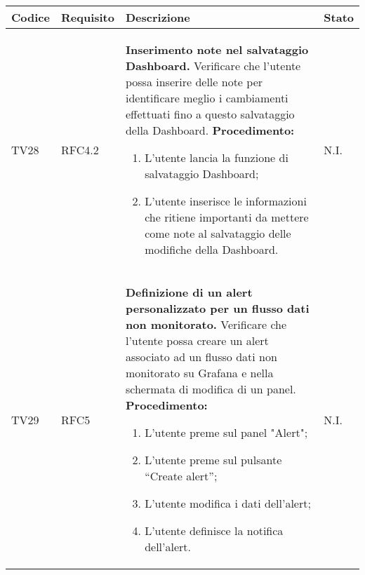 \begin{table}[!htpb]
	\centering
	\renewcommand{\arraystretch}{2} 
	\begin{tabular}{|l|l|p{10cm}|l|}
		\rowcolor{orange!50}
		\hline
		\textbf{Codice} & \textbf{Requisito}& \textbf{Descrizione} & \textbf{Stato}\\ 
		\hline
		TV28 & RFC4.2 &
			\textbf{Inserimento note nel salvataggio Dashboard.}
			\newline
			Verificare che l'utente possa inserire delle note per identificare meglio i cambiamenti effettuati fino a questo salvataggio della Dashboard.
			\newline
			\textbf{Procedimento:}
			\begin{enumerate}
				\item L'utente lancia la funzione di salvataggio Dashboard; 
				\item L’utente inserisce le informazioni che ritiene importanti da mettere come note al salvataggio delle modifiche della Dashboard.
			\end{enumerate} 
			& N.I.\\
		\hline
		TV29 & RFC5 &
			\textbf{Definizione di un alert personalizzato per un flusso dati non monitorato.} 
			\newline
			Verificare che l’utente possa creare un alert associato ad un flusso dati non monitorato su Grafana e nella schermata di modifica di un panel. 
			\newline 
			\textbf{Procedimento:} 
			\begin{enumerate} 
				\item L'utente preme sul panel "Alert"; 
				\item L’utente preme sul pulsante “Create alert”; 
				\item L'utente modifica i dati dell'alert; 
				\item L'utente definisce la notifica dell'alert.		
			\end{enumerate} 
			& N.I.\\
		\hline
	\end{tabular}
\end{table}

